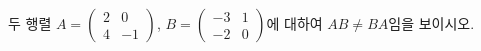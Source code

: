 \hspace*{2mm}\begin{minipage}[t]{\dimexpr\linewidth-2mm\relax}\vspace{0pt}
두 행렬 $A=\begin{pmatrix} 2 & 0 \\ 4 & -1 \end{pmatrix}$, $B=\begin{pmatrix} -3 & 1 \\ -2 & 0 \end{pmatrix}$에 대하여 $AB\ne BA$임을 보이시오.\end{minipage}
